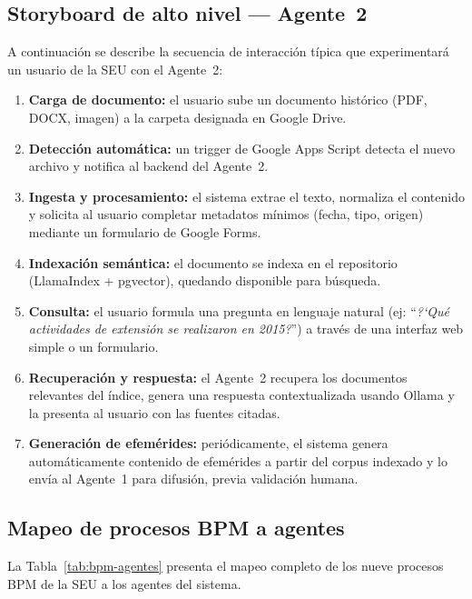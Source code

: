 \documentclass[a4paper, 12pt]{article}
\begin{document}
\subsection{Storyboard de alto nivel --- Agente~2}

A continuaci\'on se describe la secuencia de interacci\'on t\'ipica que experimentar\'a un usuario de la \ac{SEU} con el Agente~2:

\begin{enumerate}[label=\textbf{Paso \arabic*:}]
  \item \textbf{Carga de documento:} el usuario sube un documento hist\'orico (PDF, DOCX, imagen) a la carpeta designada en Google Drive.
  \item \textbf{Detecci\'on autom\'atica:} un trigger de Google Apps Script detecta el nuevo archivo y notifica al backend del Agente~2.
  \item \textbf{Ingesta y procesamiento:} el sistema extrae el texto, normaliza el contenido y solicita al usuario completar metadatos m\'inimos (fecha, tipo, origen) mediante un formulario de Google Forms.
  \item \textbf{Indexaci\'on sem\'antica:} el documento se indexa en el repositorio (LlamaIndex + pgvector), quedando disponible para b\'usqueda.
  \item \textbf{Consulta:} el usuario formula una pregunta en lenguaje natural (ej: ``\textit{?`Qu\'e actividades de extensi\'on se realizaron en 2015?}'') a trav\'es de una interfaz web simple o un formulario.
  \item \textbf{Recuperaci\'on y respuesta:} el Agente~2 recupera los documentos relevantes del \'indice, genera una respuesta contextualizada usando Ollama y la presenta al usuario con las fuentes citadas.
  \item \textbf{Generaci\'on de efem\'erides:} peri\'odicamente, el sistema genera autom\'aticamente contenido de efem\'erides a partir del corpus indexado y lo env\'ia al Agente~1 para difusi\'on, previa validaci\'on humana.
\end{enumerate}

\subsection{Mapeo de procesos BPM a agentes}

La Tabla~\ref{tab:bpm-agentes} presenta el mapeo completo de los nueve procesos \ac{BPM} de la \ac{SEU} a los agentes del sistema.
\end{document}
